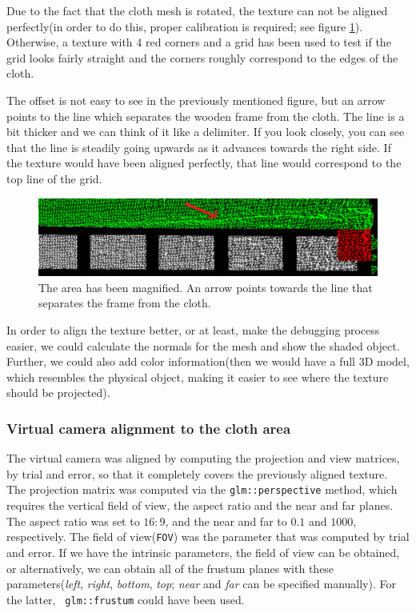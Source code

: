 \documentclass[]{article}
\begin{document}
Due to the fact that the cloth mesh is rotated, the texture can not be aligned perfectly(in order to do this, proper calibration is required; see figure \ref{fig:MisalignmentArea}). Otherwise, a texture with 4 red corners and a grid has been used to test if the grid looks fairly straight and the corners roughly correspond to the edges of the cloth. 

The offset is not easy to see in the previously mentioned figure, but an arrow points to the line which separates the wooden frame from the cloth. The line is a bit thicker and we can think of it like a delimiter. If you look closely, you can see that the line is steadily going upwards as it advances towards the right side. If the texture would have been aligned perfectly, that line would correspond to the top line of the grid.



\begin{figure}[!hbtp]
    \centering
    \includegraphics[width=1.0\textwidth]{figures/MisalignmentArea3.png}
    \caption{The area has been magnified. An arrow points towards the line that separates the frame from the cloth.}
    \label{fig:MisalignmentArea}
\end{figure}

In order to align the texture better, or at least, make the debugging process easier, we could calculate the normals for the mesh and show the shaded object. Further, we could also add color information(then we would have a full 3D model, which resembles the physical object, making it easier to see where the texture should be projected).

\subsubsection{Virtual camera alignment to the cloth area}
\label{sec:VirtualCameraAlignmentToClothArea}

The virtual camera was aligned by computing the projection and view matrices, by trial and error, so that it completely covers the previously aligned texture. The projection matrix was computed via the \verb|glm::perspective| method, which requires the vertical field of view, the aspect ratio and the near and far planes. The aspect ratio was set to $16:9$, and the near and far to $0.1$ and $1000$, respectively. The field of view(\verb|FOV|) was the parameter that was computed by trial and error. If we have the intrinsic parameters, the field of view can be obtained, or alternatively, we can obtain all of the frustum planes with these parameters(\textit{left}, \textit{right}, \textit{bottom}, \textit{top}; \textit{near} and \textit{far} can be specified manually). For the latter, \verb| glm::frustum| could have been used.
\end{document}
